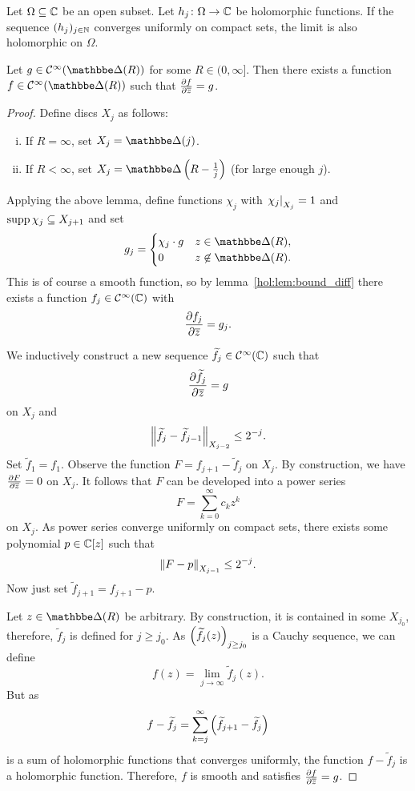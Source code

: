 \begin{lema}
Let $\Omega \subseteq \mathbb{C}$ be an open subset. Let
$h_j \colon \Omega \to \mathbb{C}$ be holomorphic functions. If the
sequence $(h_j)_{j \in \mathbb{N}}$ converges uniformly on compact sets,
the limit is also holomorphic on $\Omega$.
\end{lema}

\begin{izrek}
Let $g \in \mathcal{C}^\infty(\dsk(R))$ for some
$R \in (0, \infty]$. Then there exists a function
$f \in \mathcal{C}^\infty(\dsk(R))$ such that
$\frac{\partial f}{\partial \overline{z}} = g$.
\end{izrek}

\begin{proof}
Define discs $X_j$ as follows:

\begin{enumerate}[i)]
\item If $R = \infty$, set $X_j = \dsk(j)$.
\item If $R < \infty$, set $X_j = \dsk \br{R - \frac{1}{j}}$ (for
large enough $j$).
\end{enumerate}

Applying the above lemma, define functions $\chi_j$ with
$\left. \chi_j\right|_{X_j}^{} = 1$ and $\operatorname{supp} \chi_j \subseteq X_{j+1}$ and
set
\[
g_j =
\begin{cases}
\chi_j \cdot g & z \in \dsk(R), \\
       0       & z \not \in \dsk(R).
\end{cases}
\]
This is of course a smooth function, so by
lemma~\ref{hol:lem:bound_diff} there exists a function
$f_j \in \mathcal{C}^\infty(\mathbb{C})$ with
\[
\frac{\partial f_j}{\partial \overline{z}} = g_j.
\]

We inductively construct a new sequence
$\widetilde{f}_j \in \mathcal{C}^\infty(\mathbb{C})$ such that
\[
\frac{\partial \widetilde{f}_j}{\partial \overline{z}} = g
\]
on $X_j$ and
\[
\left\lVert \widetilde{f}_j - \widetilde{f}_{j-1}\right\rVert_{X_{j-2}} \leq 2^{-j}.
\]
Set $\widetilde{f}_1 = f_1$. Observe the function
$F = f_{j+1} - \widetilde{f}_j$ on $X_j$. By construction, we have
$\frac{\partial F}{\partial \overline{z}} = 0$ on $X_j$. It follows that $F$ can be
developed into a power series
\[
F = \sum_{k=0}^\infty c_k z^k
\]
on $X_j$. As power series converge uniformly on compact sets, there
exists some polynomial $p \in \mathbb{C}[z]$ such that
\[
\left\lVert F - p\right\rVert_{X_{j-1}} \leq 2^{-j}.
\]
Now just set $\widetilde{f}_{j+1} = f_{j+1} - p$.

Let $z \in \dsk(R)$ be arbitrary. By construction, it is contained
in some $X_{j_0}$, therefore, $\widetilde{f}_j$ is defined for
$j \geq j_0$. As $\left(\widetilde{f}_j(z)\right)_{j \geq j_0}$ is a
Cauchy sequence, we can define
\[
f(z) = \lim_{j \to \infty} \widetilde{f}_j(z).
\]
But as
\[
f - \widetilde{f}_j =
\sum_{k=j}^\infty \left(\widetilde{f}_{j+1} - \widetilde{f}_j\right)
\]
is a sum of holomorphic functions that converges uniformly, the
function $f - \widetilde{f}_j$ is a holomorphic function.
Therefore, $f$ is smooth and satisfies $\frac{\partial f}{\partial \overline{z}} = g$.
\end{proof}
